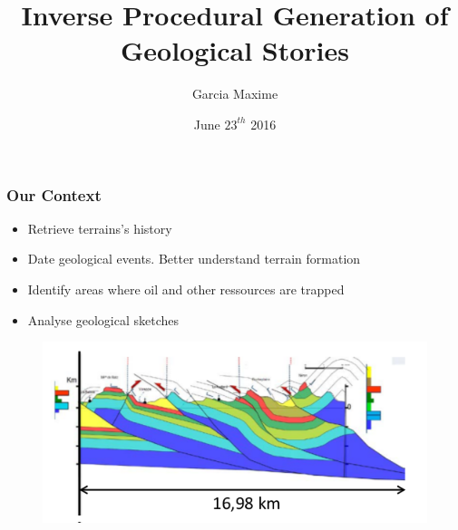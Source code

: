 \documentclass{beamer}
\title[Master of Science in Informatics at Grenoble: Master Thesis Defence]{Inverse Procedural Generation of Geological Stories}
\author{Garcia Maxime}
\institute{Mosig GVR}
\date{June $23^{th}$ 2016}
\begin{document}
	
    \begin{frame}[label=(intro)]
	\titlepage
    \end{frame}
	
	 \begin{frame}
	 \frametitle{Our Context}
	 \begin{itemize}
	 \item Retrieve terrains's history
	 \item Date geological events. Better understand terrain formation
	 \item Identify areas where oil and other ressources are trapped
	 \item Analyse geological sketches 
	 \end{itemize}
	 	\begin{figure}[H]
	\centering
	\includegraphics[scale=0.5]{Wraped_Section.png}
		\end{figure}
	 \end{frame}
	
\end{document}
